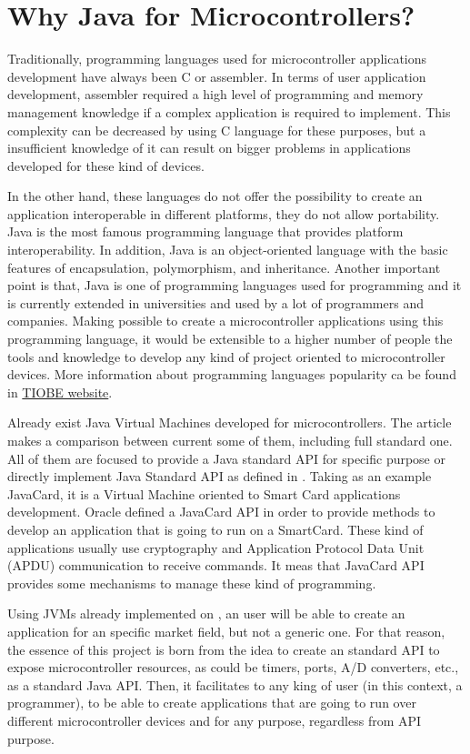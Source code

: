 \chapter{Why Java for Microcontrollers?}\label{C:Why}
Traditionally, programming languages used for microcontroller applications development have always been C or assembler. In terms of user application development, assembler required a high level of programming and memory management knowledge if a complex application is required to implement. This complexity can be decreased by using C language for these purposes, but a insufficient knowledge of it can result on bigger problems in applications developed for these kind of devices.

In the other hand, these languages do not offer the possibility to create an application interoperable in different platforms, they do not allow portability. Java is the most famous programming language that provides platform interoperability. In addition, Java is an object-oriented language with the basic features of encapsulation, polymorphism, and inheritance. Another important point is that, Java is one of programming languages used for programming and it is currently extended in universities and used by a lot of programmers and companies. Making possible to create a microcontroller applications using this programming language, it would be extensible to a higher number of people the tools and knowledge to develop any kind of project oriented to microcontroller devices. More information about programming languages popularity ca be found in \href{http://www.tiobe.com/index.php/content/paperinfo/tpci/index.html}{TIOBE website}.

Already exist Java Virtual Machines developed for microcontrollers. The article \cite{Art:Darjeeling} makes a comparison between current some of them, including full standard one. All of them are focused to provide a Java standard API for specific purpose or directly implement Java Standard API as defined in \cite{Art:JVMSE7]}. Taking as an example JavaCard, it is a Virtual Machine oriented to Smart Card applications development. Oracle defined a JavaCard API in order to provide methods to develop an application that is going to run on a SmartCard. These kind of applications usually use cryptography and Application Protocol Data Unit (APDU) communication to receive commands. It meas that JavaCard API provides some mechanisms to manage these kind of programming.

Using JVMs already implemented on \cite{Art:Darjeeling}, an user will be able to create an application for an specific market field, but not a generic one. For that reason, the essence of this project is born from the idea to create an standard API to expose microcontroller resources, as could be timers, ports, A/D converters, etc., as a standard Java API. Then, it facilitates to any king of user (in this context, a programmer), to be able to create applications that are going to run over different microcontroller devices and for any purpose, regardless from API purpose.

